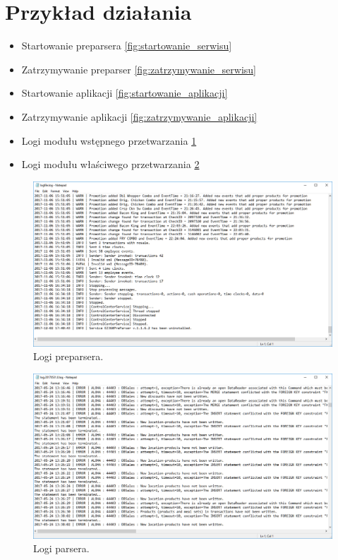 \documentclass[a4paper]{book}
\begin{document}
\section{Przykład działania}
 \begin{itemize}
	\item Startowanie preparsera \ref{fig:startowanie_serwisu}
	\item Zatrzymywanie preparser \ref{fig:zatrzymywanie_serwisu}
	\item Startowanie aplikacji \ref{fig:startowanie_aplikacji}
	\item Zatrzymywanie aplikacji \ref*{fig:zatrzymywanie_aplikacji}
	\item Logi modułu wstępnego przetwarzania \ref{fig:preparser_log}
	\item Logi modułu właściwego przetwarzania \ref{fig:parser_log}
\end{itemize}
\begin{figure}[h]
	\centering
	\includegraphics[width=\textwidth]{./img/preparser_log.png}
	\caption{Logi preparsera.}
	\label{fig:preparser_log}
\end{figure}
\begin{figure}[h]
	\centering
	\includegraphics[width=\textwidth]{./img/parser_log.png}
	\caption{Logi parsera.}
	\label{fig:parser_log}
\end{figure}
\end{document}
